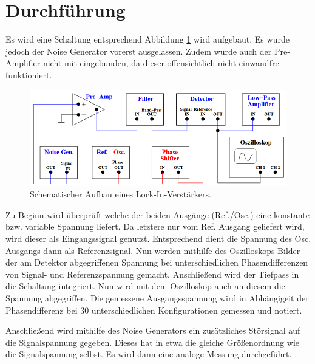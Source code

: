 \section{Durchführung}
\label{sec:Durchführung}

Es wird eine Schaltung entsprechend Abbildung \ref{fig:Schaltung1} wird aufgebaut.
Es wurde jedoch der Noise Generator vorerst ausgelassen. Zudem wurde auch der Pre-Amplifier
nicht mit eingebunden, da dieser offensichtlich nicht einwandfrei funktioniert.
\begin{figure}[H]
  \centering
  \includegraphics[width=14cm]{Schaltung1.PNG}
  \caption{Schematischer Aufbau eines Lock-In-Verstärkers. \cite{sample}}
  \label{fig:Schaltung1}
\end{figure}

Zu Beginn wird überprüft welche der beiden Ausgänge (Ref./Osc.) eine konstante bzw.
variable Spannung liefert. Da letztere nur vom Ref. Ausgang geliefert wird, wird
dieser als Eingangssignal genutzt. Entsprechend dient die Spannung des Osc. Ausgangs
dann als Referenzsignal.
Nun werden mithilfe des Oszilloskops Bilder der am Detektor abgegriffenen Spannung
bei unterschiedlichen Phasendifferenzen von Signal- und Referenzspannung gemacht.
Anschließend wird der Tiefpass in die Schaltung integriert. Nun wird mit dem Oszilloskop
auch an diesem die Spannung abgegriffen. Die gemessene Ausgangsspannung wird in
Abhängigeit der Phasendifferenz bei 30 unterschiedlichen Konfigurationen gemessen und notiert.

Anschließend wird mithilfe des Noise Generators ein zusätzliches Störsignal auf die
Signalspannung gegeben. Dieses hat in etwa die gleiche Größenordnung wie die
Signalspannung selbst. Es wird dann eine analoge Messung durchgeführt.

